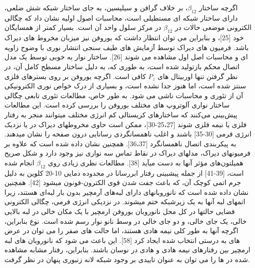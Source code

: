 اگرچه ساختار $\beta_{12}$، بر خلاف گرافن و سیلیسین، به جای ساختار شبکه شش ضلعی، دارای ساختار شبکه ای مستطیلی است، محاسبات اصول اولیه نشان داد که چگالی الکترونی موضعی حالات  در $\beta_{12}$ در مرکز سلول واحد آن است. بسیار کمتر از همسایگان خود [25]، و بنابراین می توان انتظار داشت که بوروفن نیز میزبان مخروط های دیراک باشد. فرمیون های دیراک توسط آزمایش های طیف سنجی انتشار نوری با وضوح زاویه ای  و محاسبات اصل اول مشاهده می شوند [26]. ساختار نوار به خوبی توسط یک مدل اتصال محکم بازتولید شده است، به طوری که، به دلیل ساختار مسطح کامل آن، در نظر گرفتن تنها اوربیتال های $P_z$ کافی است. اگرچه بوروفن بر روی بسترهای فلزی سنتز شده است، اما هنوز جدا نشده است، و بسیاری از درک خواص نوری الکترونیکی آن از تئوری و محاسبات ناشی می شود. به طور خاص، مطالعات تئوری تابعی چگالی  ساختار نواری آلوتروپ های مختلف بوروفن را بررسی کرده است. این مطالعات پیش‌بینی می‌کنند که ساختارهای کریستالی کم انرژی مختلف میتوانند منجر به رفتار فلزی یا نیمه فلزی شوند [25،27-30]، ممکن است حاوی مخروطهای دیراک در یا نزدیک انرژی فرمی [30-35] باشند و اغلب ناهمسانگردی رسانایی درون صفحه را نشان میدهند. به پیکربندی اتصال ناهمسانگرد [36،37]. همچنین نشان داده شده است که علاوه بر فرمیونهای دیراک، مدلهای دیراک در نقاط تماس سه نواری نیز وجود دارد و شکل صریح همیلتون‌های مؤثر آنها به دست میآید [38]. مطالعات نظری زیادی روی $\beta_{12}$ انجام شده است، [39-41] از جمله پیشبینی رفتار ابررسانا در محدوده دمایی 10-20 کلوین به دلیل جرم اتمی کوچک آن، که باعث جفت شدن قوی الکترون-فونون میشود [42].
همچنین نشان داده شده است که نانوروبانهای دارای لبه‌های آرمچیر بدون بار لبه‌ای هستند، زیرا اتمهای لبه آنها به یک زیرشبکه ختم میشوند.  در نزدیکی انرژی فرمی، چگالی الکترونی فضایی حالتها در کل محل نانوروبان بوروفن ارمچیر با یک مکان خالی در لبه بالایی خالی، یک جای خالی، و دو جای خالی در وسط نانو نوار رسم شده است. نوع بنابراین، اگرچه آنها به طور کلی نیمه هادی هستند، اما حالت های صفر را می توان در عرض های به درستی انتخاب شده ایجاد کرد [58]. این باعث می شود که نانوروبان های لبه ارمچیر بین رفتارهای نیمه هادی و هادی در نوسان باشند. بنابراین، رفتار مشابه مشاهده شده در  ها را می توان به عنوان تاییدی بر وجود شبکه لانه زنبوری پنهان در نظر گرفت.

